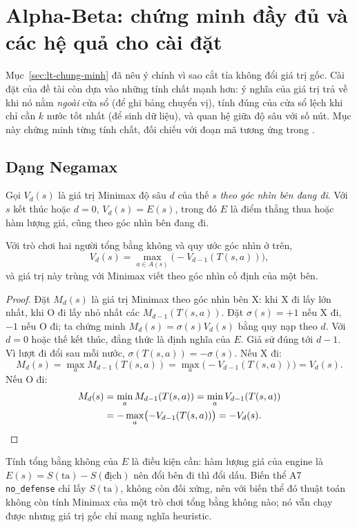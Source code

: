 \section{Alpha-Beta: chứng minh đầy đủ và các hệ quả cho cài đặt}
\label{sec:lt-ab-day-du}
Mục~\ref{sec:lt-chung-minh} đã nêu ý chính vì sao cắt tỉa không đổi giá trị gốc. Cài đặt của đề tài còn dựa vào
những tính chất mạnh hơn: ý nghĩa của giá trị trả về khi nó nằm \emph{ngoài} cửa sổ (để ghi bảng chuyển vị), tính
đúng của cửa sổ lệch khi chỉ cần $k$ nước tốt nhất (để sinh dữ liệu), và quan hệ giữa độ sâu với số nút. Mục này
chứng minh từng tính chất, đối chiếu với đoạn mã tương ứng trong .

\subsection{Dạng Negamax}
Gọi $V_d(s)$ là giá trị Minimax độ sâu $d$ của thế $s$ \emph{theo góc nhìn bên đang đi}. Với $s$ kết thúc hoặc
$d=0$, $V_d(s)=E(s)$, trong đó $E$ là điểm thắng thua hoặc hàm lượng giá, cũng theo góc nhìn bên đang đi.

\begin{dinhly}
\label{dl:cs-negamax}
Với trò chơi hai người tổng bằng không và quy ước góc nhìn ở trên,
\begin{equation}
  V_d(s)=\max_{a\in A(s)}\bigl(-V_{d-1}(T(s,a))\bigr),
  \label{eq:cs-negamax}
\end{equation}
và giá trị này trùng với Minimax viết theo góc nhìn cố định của một bên.
\end{dinhly}
\begin{proof}
Đặt $M_d(s)$ là giá trị Minimax theo góc nhìn bên X: khi X đi lấy lớn nhất, khi O đi lấy nhỏ nhất các
$M_{d-1}(T(s,a))$. Đặt $\sigma(s)=+1$ nếu X đi, $-1$ nếu O đi; ta chứng minh $M_d(s)=\sigma(s)V_d(s)$ bằng quy nạp theo $d$.
Với $d=0$ hoặc thế kết thúc, đẳng thức là định nghĩa của $E$. Giả sử đúng tới $d-1$. Vì lượt đi đổi sau mỗi nước,
$\sigma(T(s,a))=-\sigma(s)$. Nếu X đi:
\[
  M_d(s)=\max_a M_{d-1}(T(s,a))=\max_a \bigl(-V_{d-1}(T(s,a))\bigr)=V_d(s).
\]
Nếu O đi:
\begin{align*}
  M_d(s)&=\min_a M_{d-1}(T(s,a))=\min_a V_{d-1}(T(s,a))\\
        &=-\max_a\bigl(-V_{d-1}(T(s,a))\bigr)=-V_d(s).\qedhere
\end{align*}
\end{proof}
Tính tổng bằng không của $E$ là điều kiện cần: hàm lượng giá của engine là
$E(s)=S(\text{ta})-S(\text{địch})$ nên đổi bên đi thì đổi dấu. Biến thể A7 \texttt{no\_defense} chỉ lấy
$S(\text{ta})$, không còn đối xứng, nên với biến thể đó thuật toán không còn tính Minimax của một trò chơi tổng
bằng không nào; nó vẫn chạy được nhưng giá trị gốc chỉ mang nghĩa heuristic.

